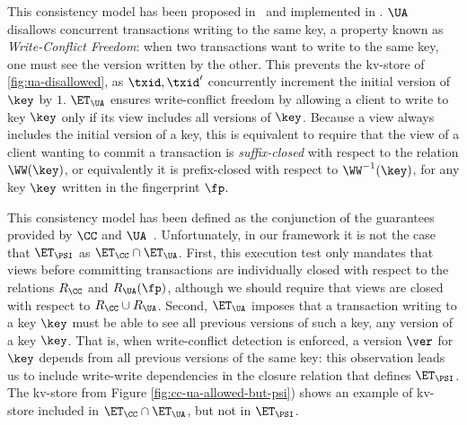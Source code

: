 This consistency model has been proposed in~\cite{framework-concur} 
and implemented in \cite{rola}.
$\UA$ disallows concurrent transactions writing to the same key,
a property known as \emph{Write-Conflict Freedom}:  
when two transactions want to write to the same key, one must see the version 
written by the other.
This prevents the kv-store of \cref{fig:ua-disallowed},
as $\txid, \txid'$ concurrently increment the initial version of $\key$ by $1$.
$\ET_\UA$ ensures write-conflict freedom by allowing a client to write to key $\key$
only if its view includes all versions of $\key$. Because a view always includes the 
initial version of a key, this is equivalent to require that the view of a client wanting 
to commit a transaction is \emph{suffix-closed} with respect to the relation $\WW(\key)$, 
or equivalently it is prefix-closed with respect to $\WW^{-1}(\key)$, for any key $\key$ written in the 
fingerprint $\fp$.

This consistency model has been defined as the conjunction of the guarantees provided by $\CC$ and $\UA$~\cite{framework-concur}. 
Unfortunately, in our framework it is not the case that $\ET_{\PSI}$ as $\ET_{\CC} \cap \ET_{\UA}$. First,  
this execution test only mandates that views before committing transactions are individually closed with respect to 
the relations $R_{\CC}$ and $R_{\UA}(\fp)$, although we should require that views are closed with respect to 
$R_{\CC} \cup R_{\UA}$. Second, $\ET_{\UA}$ imposes that a transaction writing 
to a key $\key$ must be able to see all previous versions of such a key, \ie any version of a key $\key$. 
That is, when write-conflict detection is enforced, a version $\ver$ for $\key$ depends from all 
previous versions of the same key: this observation leads us to include write-write dependencies 
in the closure relation that defines $\ET_{\PSI}$. The kv-store from Figure
\cref{fig:cc-ua-allowed-but-psi}) shows an example of kv-store included in $\ET_{\CC} \cap \ET_{\UA}$, 
but not in $\ET_{\PSI}$.

